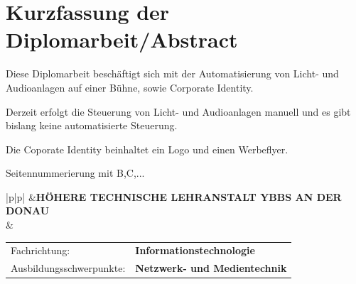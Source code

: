 \chapter*{Kurzfassung der Diplomarbeit/Abstract} 

Diese Diplomarbeit beschäftigt sich mit der Automatisierung von Licht- und Audioanlagen auf einer Bühne, sowie Corporate Identity.

Derzeit erfolgt die Steuerung von Licht- und Audioanlagen manuell und es gibt bislang keine automatisierte Steuerung. 

Die Coporate Identity beinhaltet ein Logo und einen Werbeflyer. 

Seitennummerierung mit B,C,...

\clearpage

\newlength{\htllogobreite}
\newlength{\beschriftungsbreite}
\newlength{\feldA}
\newlength{\feldB}

\begin{tabular}{|p{\htllogobreite}|p{\beschriftungsbreite}|}
\hline
{}&{\vspace{0.05em}\textbf{HÖHERE TECHNISCHE LEHRANSTALT YBBS AN DER DONAU}}\\[1.05em]
 & { \begin{tabular}{p{\feldA} p{\feldB}}
    Fachrichtung:&\textbf{Informationstechnologie}\\
    Ausbildungsschwerpunkte:&\textbf{Netzwerk- und Medientechnik}\\
   \end{tabular}
   }\\
\hline
\end{tabular}

